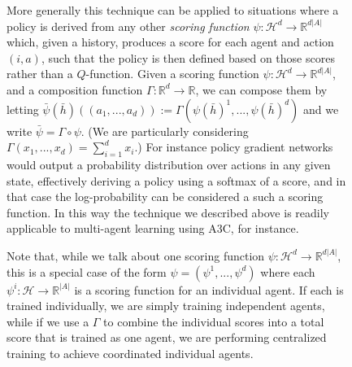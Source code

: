 \documentclass{article}
\begin{document}
\begin{figure}
More generally this technique can be applied to situations where a policy is derived from any other \emph{scoring function} $\psi:\mathcal{H}^d\to\mathbb{R}^{d|A|}$ which, given a history, produces a score for each agent and action $(i,a)$, such that the policy is then defined based on those scores rather than a $Q$-function. Given a scoring function $\psi:\mathcal{H}^d\to\mathbb{R}^{d|A|}$, and a composition function $\Gamma:\mathbb{R}^d\to\mathbb{R}$, we can compose them by letting $\bar{\psi}(\bar{h})((a_1,...,a_d)) := \Gamma(\psi(\bar{h})^1,...,\psi(\bar{h})^d)$ and we write $\bar{\psi} = \Gamma\circ\psi$. (We are particularly considering $\Gamma(x_1,...,x_d)=\sum_{i=1}^d x_i$.) For instance policy gradient networks would output a probability distribution over actions in any given state, effectively deriving a policy using a softmax of a score, and in that case the log-probability can be considered a such a scoring function. In this way the technique we described above is readily applicable to multi-agent learning using A3C, for instance.


Note that, while we talk about one scoring function $\psi:\mathcal{H}^d\to\mathbb{R}^{d|A|}$, this is a special case of the form $\psi = (\psi^1,...,\psi^d)$ where each $\psi^i:\mathcal{H}\to\mathbb{R}^{|A|}$ is a scoring function for an individual agent. If each is trained individually, we are simply training independent agents, while if we use a $\Gamma$ to combine the individual scores into a total score that is trained as one agent, we are performing centralized training to achieve coordinated individual agents.
\fi

\end{figure}
\end{document}
